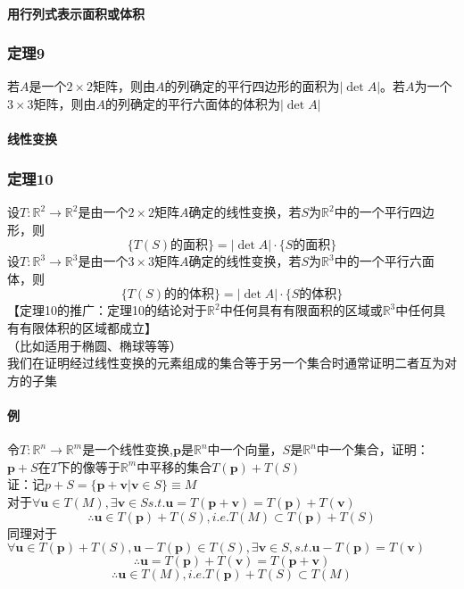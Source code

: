 \documentclass{article}
\newcommand{\ve}{\boldsymbol}
\begin{document}
\begin{CJK}{UTF8}{gkai}
\paragraph{用行列式表示面积或体积\\}
\subsubsection{定理9}
若$A$是一个$2\times 2$矩阵，则由$A$的列确定的平行四边形的面积为$\left|\det A\right|$。若$A$为一个$3\times 3$矩阵，则由$A$的列确定的平行六面体的体积为$\left|\det A\right|$
\paragraph{线性变换\\}
\subsubsection{定理10}
设$T:\mathbb{R}^2\to\mathbb{R}^2$是由一个$2\times 2$矩阵$A$确定的线性变换，若$S$为$\mathbb{R}^2$中的一个平行四边形，则
\[\{T(S)\text{的面积}\}=\left|\det A\right|\cdot\{S\text{的面积}\}\]
设$T:\mathbb{R}^3\to\mathbb{R}^3$是由一个$3\times 3$矩阵$A$确定的线性变换，若$S$为$\mathbb{R}^3$中的一个平行六面体，则
\[\{T(S)\text{的的体积}\}=\left|\det A\right|\cdot\{S\text{的体积}\}\]
【定理10的推广：定理10的结论对于$\mathbb{R}^2$中任何具有有限面积的区域或$\mathbb{R}^3$中任何具有有限体积的区域都成立】\\
（比如适用于椭圆、椭球等等）\\


我们在证明经过线性变换的元素组成的集合等于另一个集合时通常证明二者互为对方的子集\\
\paragraph{例\\}
令$T:\mathbb{R}^n\to\mathbb{R}^m$是一个线性变换,$\ve{p}$是$\mathbb{R}^n$中一个向量，$S$是$\mathbb{R}^n$中一个集合，证明：$\ve{p}+S$在$T$下的像等于$\mathbb{R}^m$中平移的集合$T(\ve{p})+T(S)$\\

证：记$p+S=\{\ve{p}+\ve{v}|\ve{v}\in S\}\equiv M$\\
对于$\forall \ve{u}\in T(M),\exists \ve{v}\in S s.t.\ve{u}=T(\ve{p}+\ve{v})=T(\ve{p})+T(\ve{v})$\\
\[\therefore \ve{u}\in T(\ve{p})+T(S),i.e. T(M)\subset T(\ve{p})+T(S)\]
同理对于$\forall \ve{u}\in T(\ve{p})+T(S),\ve{u}-T(\ve{p})\in T(S),\exists \ve{v}\in S,s.t.\ve{u}-T(\ve{p})=T(\ve{v})$\\
\[\therefore \ve{u}=T(\ve{p})+T(\ve{v})=T(\ve{p}+\ve{v})\]
\[\therefore \ve{u}\in T(M),i.e. T(\ve{p})+T(S)\subset T(M)\]


\end{CJK}
\end{document}
